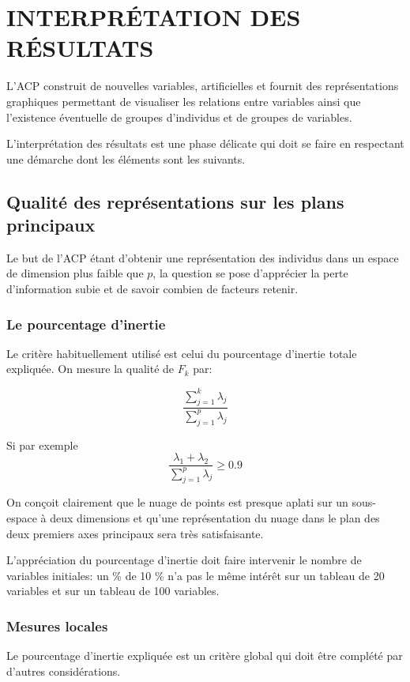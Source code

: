 \documentclass[12pt,a4paper]{article}
\begin{document}
\section{INTERPRÉTATION DES RÉSULTATS}

L'ACP construit de nouvelles variables, artificielles et fournit des représentations
graphiques permettant de visualiser les relations entre variables ainsi que l'existence éventuelle de groupes d'individus et de groupes de variables.

L'interprétation des résultats est une phase délicate qui doit se faire en respectant une
démarche dont les éléments sont les suivants.

\subsection{Qualité des représentations sur les plans principaux}

Le but de l'ACP étant d'obtenir une représentation des individus dans un espace de
dimension plus faible que $p$, la question se pose d'apprécier la perte d'information subie et
de savoir combien de facteurs retenir.

\subsubsection{Le pourcentage d'inertie}

Le critère habituellement utilisé est celui du pourcentage d'inertie totale expliquée.
On mesure la qualité de $F_k$ par:

\[\frac{\sum_{j=1}^k \lambda_j}{\sum_{j=1}^p \lambda_j}\]

Si par exemple
\[\frac{\lambda_1 + \lambda_2}{\sum_{j=1}^p \lambda_j} \geq 0.9\]

On conçoit clairement que le nuage de points est presque
aplati sur un sous-espace à deux dimensions et qu'une représentation du nuage dans le plan
des deux premiers axes principaux sera très satisfaisante.

L'appréciation du pourcentage d'inertie doit faire intervenir le nombre de variables
initiales: un \% de 10 \% n'a pas le même intérêt sur un tableau de 20 variables et sur un
tableau de 100 variables.

\subsubsection{Mesures locales}

Le pourcentage d'inertie expliquée est un critère global qui doit être complété par d'autres
considérations.
\end{document}
